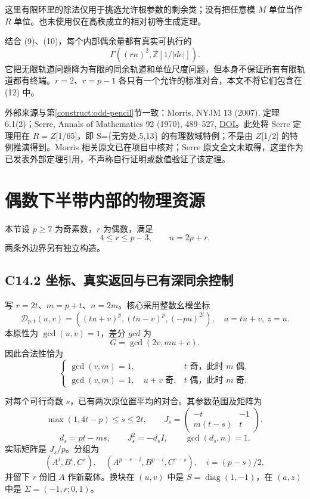 {这里有限环里的除法仅用于挑选允许根参数的剩余类；没有把任意模} {\ensuremath{M}} {单位当作} {\ensuremath{R}} {单位。也未使用仅在高秩成立的相对初等生成定理。}

{结合} {(9)、(10)，每个内部偶余量都有真实可执行的} \[
\boxed{\Gamma((rn)^2,\mathbb Z[1/|de|]).}
\tag{C13.12}
\] {它把无限轨道问题降为有限的同余轨道和单位尺度问题，但本身不保证所有有限轨道都有终端。\ensuremath{r=2}、\ensuremath{r=p-1}} {各只有一个允许的标准对合，本文不将它们包含在} {(12)} {中。}

{外部来源与}第\ref{construct:odd-pencil}节{一致：Morris,} {NYJM} {13} {(2007),} {定理} {6.1(2)；Serre,} {Annals} {of} {Mathematics} {92} {(1970),} {489--527,} \href{https://doi.org/10.2307/1970630}{DOI}{。此处将} {Serre} {定理用在} {\ensuremath{R=Z}{[}1/65{]}，即} {S=\{无穷处,5,13\}} {的有理数域特例；不是由} {\ensuremath{Z}{[}1/2{]}} {的特例推演得到。Morris} {相关原文已在项目中核对；Serre} {原文全文未取得，这里作为已发表外部定理引用，不声称自行证明或数值验证了该定理。}


\section{偶数下半带内部的物理资源}\label{construct:even-interior}
{本节设} \(p\ge7\) {为奇素数，}\(r\) {为偶数，满足} \[4\le r\le p-3,\qquad n=2p+r.\tag{C14.1}\] {两条外边界另有独立构造。}

\subsection*{\texorpdfstring{{C14.2} {坐标、真实返回与已有深同余控制}}{C14.2 坐标、真实返回与已有深同余控制}}\label{C14-h92}

{写} \(r=2t\){、}\(m=p+t\){、}\(n=2m\){。核心采用整数幺模坐标} \[
\mathcal D_{p,t}(u,v)=((tu+v)^p,(tu-v)^p,(-pu)^{2t}),
\quad a=tu+v,\ z=u.
\] {本原性为} \(\gcd(u,v)=1\){，差分} {\ensuremath{gcd}} {为} \[
G=\gcd(2v,mu+v).
\] {因此合法性恰为} \[
\begin{cases}
\gcd(v,m)=1,&t\text{ 奇，此时 }m\text{ 偶},\\
\gcd(v,m)=1,\quad u+v\text{ 奇},&t\text{ 偶，此时 }m\text{ 奇}.
\end{cases}\tag{C14.3}
\]

{对每个可行奇数} \(s\){，已有两次原位置平均的对合。其参数范围及矩阵为} \[
\max(1,4t-p)\le s\le2t,\qquad
J_s=\begin{pmatrix}-t&-1\\m(t-s)&t\end{pmatrix},
\] \[
d_s=pt-ms,\qquad J_s^2=-d_sI,\qquad \gcd(d_s,n)=1.
\tag{C14.4}
\] {实际矩阵是} \(J_s/p\){。分组为} \[
(A^i,B^i,C^s),\quad(A^{p-r-i},B^{p-i},C^{r-s}),\quad
i=(p-s)/2,
\] {并留下} \(r\) {份旧} \(A\) {作新载体。换块在} \((u,v)\) {中是} \(S=\operatorname{diag}(1,-1)\){，在} \((a,z)\) {中是} \(\Sigma=(-1,r;0,1)\){。}

